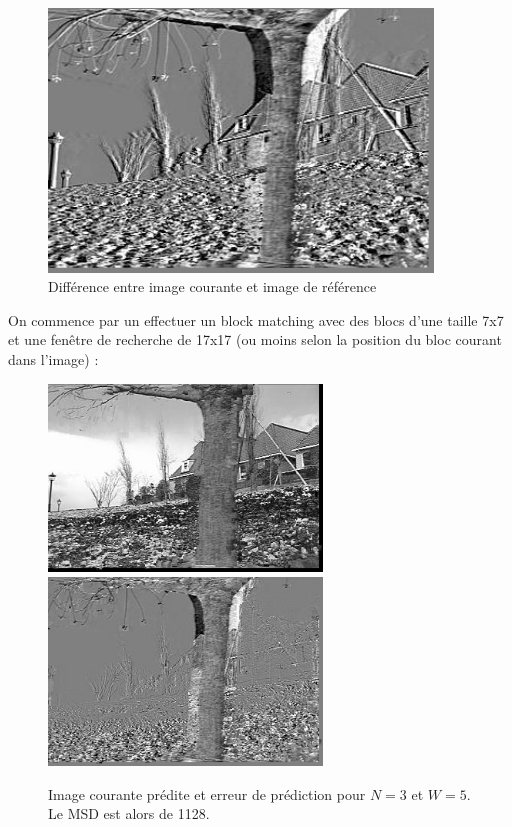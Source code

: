 \documentclass[a4paper, 12pt]{article}
\begin{document}
\begin{figure}[H]
	\centering
	\includegraphics[height=7cm]{../Resultats/Garden/garden_error.jpg}
	\caption{Différence entre image courante et image de référence}
	\label{fig:garden_error}
\end{figure}

On commence par un effectuer un block matching avec des blocs d'une taille 7x7 et une fenêtre de recherche de 17x17 (ou moins selon la position du bloc courant dans l'image) :

\begin{figure}[H]
	\centering
	\includegraphics[height=5cm]{../Resultats/Garden/garden_pred_n_3_w_5.jpg}
	\includegraphics[height=5cm]{../Resultats/Garden/garden_error_n_3_w_5.jpg}
	\caption{Image courante prédite et erreur de prédiction pour $N=3$ et $W=5$. Le MSD est alors de 1128.}
	\label{fig:garden_3_5}
\end{figure}
\end{document}
